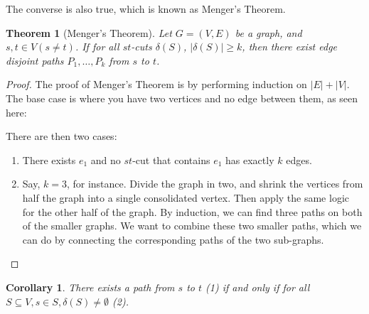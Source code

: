 \documentclass[]{article}
\newtheorem*{theorem}{Theorem}
\newtheorem*{corollary}{Corollary}
\theoremstyle{definition}
\newcommand{\lecture}[1]{\marginpar{{\footnotesize $\leftarrow$ \underline{#1}}}}
\begin{document}
				The converse is also true, which is known as Menger's Theorem.

				\begin{theorem}[Menger's Theorem]
					Let $G = (V, E)$ be a graph, and $s, t \in V (s \ne t)$. If for all $st$-cuts $\delta(S)$, $|\delta(S)| \ge k$, then there exist edge disjoint paths $P_1, \ldots, P_k$ from $s$ to $t$.
				\end{theorem}

				\begin{proof}
					The proof of Menger's Theorem is by performing induction on $|E| + |V|$. The base case is where you have two vertices and no edge between them, as seen here:
					\begin{center}
					\end{center}

					There are then two cases:
					\begin{enumerate}
						\item There exists $e_1$ and no $st$-cut that contains $e_1$ has exactly $k$ edges.
						\item Say, $k = 3$, for instance. Divide the graph in two, and shrink the vertices from half the graph into a single consolidated vertex. Then apply the same logic for the other half of the graph. By induction, we can find three paths on both of the smaller graphs. We want to combine these two smaller paths, which we can do by connecting the corresponding paths of the two sub-graphs.
					\end{enumerate}
				\end{proof}

				\begin{corollary} \lecture{March 4, 2013}
					There exists a path from $s$ to $t$ (1) if and only if for all $S \subseteq V, s \in S, \delta(S) \ne \emptyset$ (2).
				\end{corollary}
\end{document}
